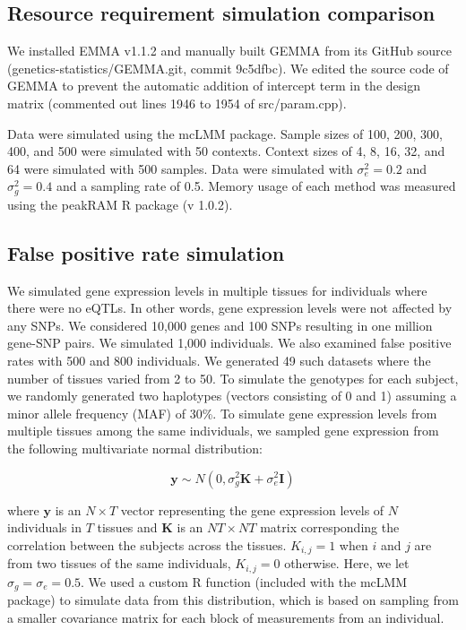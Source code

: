     \subsection{Resource requirement simulation comparison}
        We installed EMMA v1.1.2 and manually built GEMMA from its GitHub source (genetics-statistics/GEMMA.git, commit 9c5dfbc). We edited the source code of GEMMA to prevent the automatic addition of intercept term in the design matrix (commented out lines 1946 to 1954 of src/param.cpp).
        
        Data were simulated using the mcLMM package. Sample sizes of 100, 200, 300, 400, and 500 were simulated with 50 contexts. Context sizes of 4, 8, 16, 32, and 64 were simulated with 500 samples. Data were simulated with $\sigma^2_e=0.2$ and $\sigma^2_g=0.4$ and a sampling rate of 0.5. Memory usage of each method was measured using the peakRAM R package (v 1.0.2). 
    
    \subsection{False positive rate simulation}
        We simulated gene expression levels in multiple tissues for individuals where there were no eQTLs. In other words, gene expression levels were not affected by any SNPs. We considered 10,000 genes and 100 SNPs resulting in one million gene-SNP pairs. We simulated 1,000 individuals. We also examined false positive rates with 500 and 800 individuals. We generated 49 such datasets where the number of tissues varied from 2 to 50. To simulate the genotypes for each subject, we randomly generated two haplotypes (vectors consisting of 0 and 1) assuming a minor allele frequency (MAF) of 30\%. To simulate gene expression levels from multiple tissues among the same individuals, we sampled gene expression from the following multivariate normal distribution:
        
        \begin{equation}
            \mathbf{y} \sim N(0,\sigma_g^2\mathbf{K} + \sigma_e^2\mathbf{I} )
        \end{equation}
        
        where $\mathbf{y}$ is an $N \times T$ vector representing the gene expression levels of $N$ individuals in $T$ tissues and $\mathbf{K}$ is an $NT \times NT$ matrix corresponding the correlation between the subjects across the tissues. $K_{i,j} = 1$ when $i$ and $j$ are from two tissues of the same individuals, $K_{i,j} = 0$ otherwise. Here, we let $\sigma_g = \sigma_e = 0.5$. We used a custom R function (included with the mcLMM package) to simulate data from this distribution, which is based on sampling from a smaller covariance matrix for each block of measurements from an individual.
        
